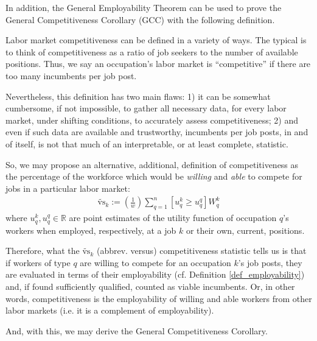 \documentclass[hidelinks, nonatbib]{elsarticle}
\begin{document}
In addition, the General Employability Theorem can be used to prove the General Competitiveness Corollary (GCC) with the following definition.
\begin{definition}[Competitiveness]
    \label{def_competitiveness}
    Labor market competitiveness can be defined in a variety of ways. The typical is to think of competitiveness as a ratio of job seekers to the number of available positions. Thus, we say an occupation's labor market is ``competitive'' if there are too many incumbents per job post.
    
    Nevertheless, this definition has two main flaws: 1) it can be somewhat cumbersome, if not impossible, to gather all necessary data, for every labor market, under shifting conditions, to accurately assess competitiveness; 2) and even if such data are available and trustworthy, incumbents per job posts, in and of itself, is not that much of an interpretable, or at least complete, statistic.
    
    So, we may propose an alternative, additional, definition of competitiveness as the percentage of the workforce which would be \textit{willing} and \textit{able} to compete for jobs in a particular labor market:
    \begin{gather}
        \tilde{\text{vs}}_{k}
        :=
        \left(
            \frac{1}{w}
        \right)
        \sum_{q=1}^{n}
        \left[
            u_{q}^{k}
            \geq
            u_{q}^{q}
        \right]
        W_{q}^{k}
    \end{gather}
    where $u_{q}^{k}, u_{q}^{q} \in \mathbb{R}$ are point estimates of the utility function of occupation $q$'s workers when employed, respectively, at a job $k$ or their own, current, positions.
    
    Therefore, what the $\tilde{\text{vs}}_{k}$ (abbrev. versus) competitiveness statistic tells us is that if workers of type $q$ are willing to compete for an occupation $k$'s job posts, they are evaluated in terms of their employability (cf. Definition \ref{def_employability}) and, if found sufficiently qualified, counted as viable incumbents. Or, in other words, competitiveness is the employability of willing and able workers from other labor markets (i.e. it is a complement of employability).
\end{definition}
And, with this, we may derive the General Competitiveness Corollary.
\end{document}
